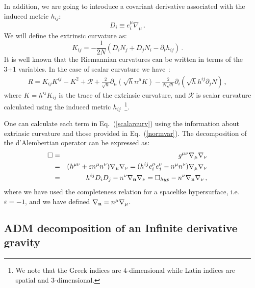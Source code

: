 \documentclass[a4paper,12pt]{article}
\newcommand{\bn}{\bold{n}}
\newcommand{\+}{^{\dagger}}
\newcommand{\2}{\frac{1}{2}}
\newcommand{\3}{\frac{1}{3}}
\newcommand{\4}{\frac{1}{4}}
\newcommand{\6}{\frac{1}{6}}
\newcommand{\8}{\frac{1}{8}}
\begin{document}
In addition, we are going to introduce a covariant derivative associated with the induced
metric $h_{ij}$:
$$D_i\equiv e^{\mu}_{i}\nabla_\mu\,.$$
  We will  define the extrinsic curvature as:
\begin{equation}\label{extrinsiccurvature}
K_{ij}=-\frac{1}{2N}\left(D_{i}N_{j}+D_{j}N_{i}-\partial_{t}h_{ij}\right)\,.
\end{equation} 
It is well known that the Riemannian curvatures can be written in terms of
the 3+1 variables. In the case of scalar curvature we have~\cite{Gourgoulhon:2007ue}: 
\begin{eqnarray}\label{scalarcurv}
R=K_{ij}K^{ij}-K^2+\mathcal{R}+\frac{2}{\sqrt{h}}\partial_\mu(\sqrt{h}n^\mu
K)-\frac{2}{N\sqrt{h}}\partial_i(\sqrt{h}h^{ij}\partial_j N)\,,
\end{eqnarray} 
where $K=h^{ij}K_{ij}$ is the trace of the extrinsic curvature, and $\mathcal{R}$
is scalar curvature calculated using the induced metric $h_{ij}$~\footnote{We note
that the Greek indices are $4$-dimensional while Latin indices are spatial
and $3$-dimensional.}. 

One can calculate each term in Eq.~(\ref{scalarcurv})
using the information about extrinsic curvature and those provided in Eq.~(\ref{normvar}).
The decomposition of the d'Alembertian operator can be expressed as:
\begin{eqnarray}\label{boxdecomposition}
\Box&=&g^{\mu\nu}\nabla_\mu\nabla_\nu\\\nonumber
&=&(h^{\mu\nu}+\varepsilon n^\mu n^\nu)\nabla_\mu\nabla_\nu=(h^{ij}e^{\mu}_{i}e^{\nu}_{j}-
n^\mu n^\nu)\nabla_\mu\nabla_\nu\\\nonumber
&=&h^{ij}D_iD_j-n^\nu\nabla_\bn\nabla_\nu=\Box_{hyp}-n^\nu\nabla_\bn\nabla_\nu\,,
\end{eqnarray} 
where we have used the completeness relation for a spacelike hypersurface, i.e.
$\varepsilon=-1$, and we have defined $\nabla_\bn=n^\mu\nabla_\mu$.



\subsection{ADM decomposition of an Infinite derivative gravity}
\label{sec:inf}
\end{document}
